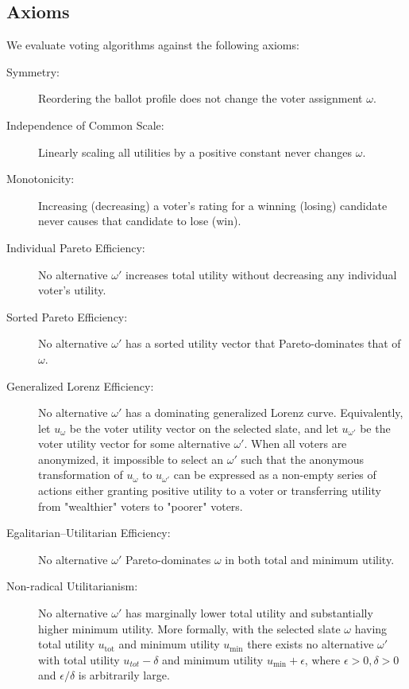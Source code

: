 \documentclass[11pt]{article}
\begin{document}
\subsection{Axioms} \label{sec:axioms}

We evaluate voting algorithms against the following axioms:
\begin{description}
    \item[Symmetry:] Reordering the ballot profile does not change the voter assignment $\omega$.
    \item[Independence of Common Scale:] Linearly scaling all utilities by a positive constant never changes $\omega$.
    \item[Monotonicity:] Increasing (decreasing) a voter’s rating for a winning (losing) candidate never causes that candidate to lose (win).
    \item[Individual Pareto Efficiency:] No alternative $\omega'$ increases total utility without decreasing any individual voter's utility.
    \item[Sorted Pareto Efficiency:] \textbf{\citep{sorted-pareto}} No alternative $\omega'$ has a sorted utility vector that Pareto-dominates that of $\omega$.
    \item[Generalized Lorenz Efficiency:] \textbf{\citep{shorrocks-1983}} No alternative $\omega'$ has a dominating generalized Lorenz curve. Equivalently, let $u_{\omega}$ be the voter utility vector on the selected slate, and let $u_{\omega'}$ be the voter utility vector for some alternative $\omega'$. When all voters are anonymized, it impossible to select an $\omega'$ such that the anonymous transformation of $u_{\omega}$ to $u_{\omega'}$ can be expressed as a non-empty series of actions either granting positive utility to a voter or transferring utility from "wealthier" voters to "poorer" voters.
    \item[Egalitarian--Utilitarian Efficiency:] No alternative $\omega'$ Pareto-dominates $\omega$ in both total and minimum utility.
    \item[Non-radical Utilitarianism:] No alternative $\omega'$ has marginally lower total utility and substantially higher minimum utility. More formally, with the selected slate $\omega$ having total utility $u_{\mathrm{tot}}$ and minimum utility $u_{\mathrm{min}}$ there exists no alternative $\omega'$ with total utility $u_{tot} - \delta$ and minimum utility $u_{\mathrm{min}} + \epsilon$, where $\epsilon > 0, \delta > 0$ and $\epsilon/\delta$ is arbitrarily large.
\end{description}
\end{document}
